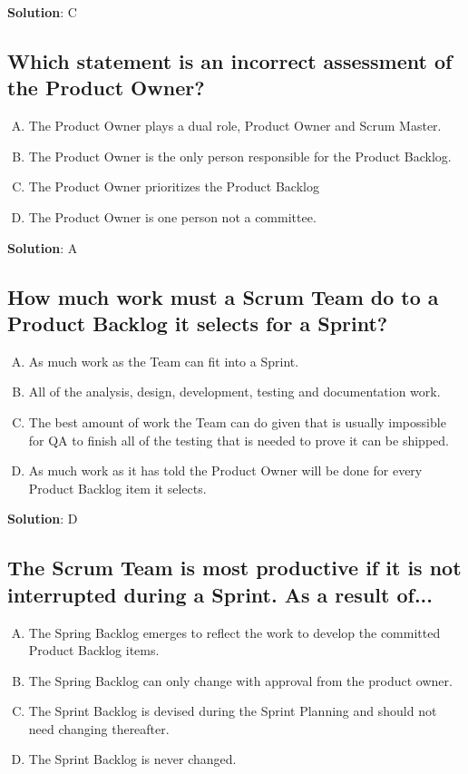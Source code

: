 \textbf{Solution}: C


\subsection{Which statement is an incorrect assessment of the Product Owner?}
\begin{enumerate}[A)]
  \item The Product Owner plays a dual role, Product Owner and Scrum Master.
  \item The Product Owner is the only person responsible for the Product Backlog.
  \item The Product Owner prioritizes the Product Backlog
  \item The Product Owner is one person not a committee.
\end{enumerate}


\textbf{Solution}: A


\subsection{How much work must a Scrum Team do to a Product Backlog it selects for a Sprint?}
\begin{enumerate}[A)]
  \item As much work as the Team can fit into a Sprint.
  \item All of the analysis, design, development, testing and documentation work.
  \item The best amount of work the Team can do given that is usually impossible for QA to finish all of the testing that is needed to prove it can be shipped.
  \item As much work as it has told the Product Owner will be done for every Product Backlog item it selects.
\end{enumerate}


\textbf{Solution}: D


\subsection{The Scrum Team is most productive if it is not interrupted during a Sprint. As a result of...}
\begin{enumerate}[A)]
  \item The Spring Backlog emerges to reflect the work to develop the committed Product Backlog items.
  \item The Spring Backlog can only change with approval from the product owner.
  \item The Sprint Backlog is devised during the Sprint Planning and should not need changing thereafter.
  \item The Sprint Backlog is never changed.
\end{enumerate}


